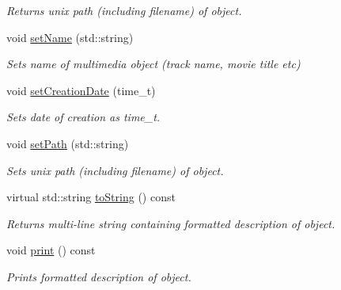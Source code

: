 \begin{DoxyCompactItemize}
\begin{DoxyCompactList}\small\item\em Returns unix path (including filename) of object. \end{DoxyCompactList}\item 
\hypertarget{classBaseObject_a3999488d0dd4e825641ece8f332385e1}{void \hyperlink{classBaseObject_a3999488d0dd4e825641ece8f332385e1}{set\-Name} (std\-::string)}\label{classBaseObject_a3999488d0dd4e825641ece8f332385e1}

\begin{DoxyCompactList}\small\item\em Sets name of multimedia object (track name, movie title etc) \end{DoxyCompactList}\item 
\hypertarget{classBaseObject_aeeb327051d61bd727722f583fa0bc41c}{void \hyperlink{classBaseObject_aeeb327051d61bd727722f583fa0bc41c}{set\-Creation\-Date} (time\-\_\-t)}\label{classBaseObject_aeeb327051d61bd727722f583fa0bc41c}

\begin{DoxyCompactList}\small\item\em Sets date of creation as time\-\_\-t. \end{DoxyCompactList}\item 
\hypertarget{classBaseObject_a06461859fe33fc77fee0b74dbbe1b57d}{void \hyperlink{classBaseObject_a06461859fe33fc77fee0b74dbbe1b57d}{set\-Path} (std\-::string)}\label{classBaseObject_a06461859fe33fc77fee0b74dbbe1b57d}

\begin{DoxyCompactList}\small\item\em Sets unix path (including filename) of object. \end{DoxyCompactList}\item 
\hypertarget{classBaseObject_aab08eee6684fdfa0852b1f914379b9c4}{virtual std\-::string \hyperlink{classBaseObject_aab08eee6684fdfa0852b1f914379b9c4}{to\-String} () const }\label{classBaseObject_aab08eee6684fdfa0852b1f914379b9c4}

\begin{DoxyCompactList}\small\item\em Returns multi-\/line string containing formatted description of object. \end{DoxyCompactList}\item 
void \hyperlink{classBaseObject_a9bad65dddde7dec1ea622edce664cc9f}{print} () const 
\begin{DoxyCompactList}\small\item\em Prints formatted description of object. \end{DoxyCompactList}\end{DoxyCompactItemize}


